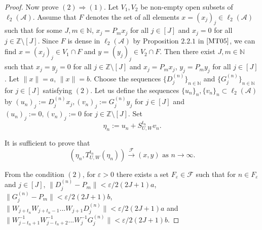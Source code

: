 \documentclass{article}
\begin{document}
\begin{proof}
Now prove $(2)\Rightarrow(1)$. Let $V_{1}, V_{2}$ be non-empty open subsets of $\ell_{2}(\mathcal{A})$.
Assume that $F$ denotes the set of all elements $x=(x_{j})_{j}\in \ell_{2}(\mathcal{A})$ such that for some $J,m\in \mathbb{N}$, $x_{j}=P_{m}x_{j}$ for all $j\in [J]$ and $x_{j}=0$ for all $j\in \mathbb{Z}\setminus [J]$.
Since $F$ is dense in $\ell_{2}(\mathcal{A})$ by Proposition $2.2.1$ in $\cite{MT05}$, we can find $x=(x_{j})_{j}\in V_{1}\cap F$ and $y=(y_{j})_{j}\in V_{2}\cap F$. Then there exist $J,m\in\mathbb{N}$ such that $x_{j}=y_{j}=0$ for all $j\in\mathbb{Z}\setminus[J]$ and $x_{j}=P_{m}x_{j}$, $y_{j}=P_{m}y_{j}$ for all $j\in[J]$. Let $\|x\|=a$, $\|x\|=b$. Choose the sequences $\{D^{(n)}_{j}\}_{n\in\mathbb{N}}$ and $\{G^{(n)}_{j}\}_{n\in\mathbb{N}}$ for $j\in[J]$ satisfying $(2)$. Let us define the sequences $\{u_{n}\}_{n},\{v_{n}\}_{n}\subset\ell_{2}{(\mathcal{A})}$ by $(u_{n})_{j}:=D^{(n)}_{j}x_{j}, (v_{n})_{j}:=G^{(n)}_{j}y_{j}$ for $j\in [J]$ and $(u_{n})_{j}:=0, (v_{n})_{j}:=0$ for $j\in\mathbb{Z}\setminus[J]$. Set
\[\eta_{n}:=u_{n}+S^{t_{n}}_{U,W}v_{n}.\]

It is sufficient to prove that
\[\left(\eta_{n}, T^{t_{n}}_{U,W}(\eta_{n})\right)\stackrel{\mathcal F}{\longrightarrow}(x,y) \textrm{ as } n\rightarrow\infty.\]

From the condition $(2)$, for $\varepsilon>0$ there exists a set $F_{\varepsilon}\in\mathcal{F}$ such that for $n\in F_{\varepsilon}$ and $j\in[J]$, $\|D^{(n)}_{j}-P_{m}\|<\varepsilon/2(2J+1)a$, $\|G^{(n)}_{j}-P_{m}\|<\varepsilon/2(2J+1)b$, $\|W_{j+t_{n}}W_{j+t_{n}-1}...W_{j+1}D^{(n)}_{j}\|<\varepsilon/2(2J+1)a$ and $\|W^{-1}_{j-t_{n}+1}W^{-1}_{j-t_{n}+2}...W^{-1}_{j}G^{(n)}_{j}\|<\varepsilon/2(2J+1)b$.


\end{proof}
\end{document}
